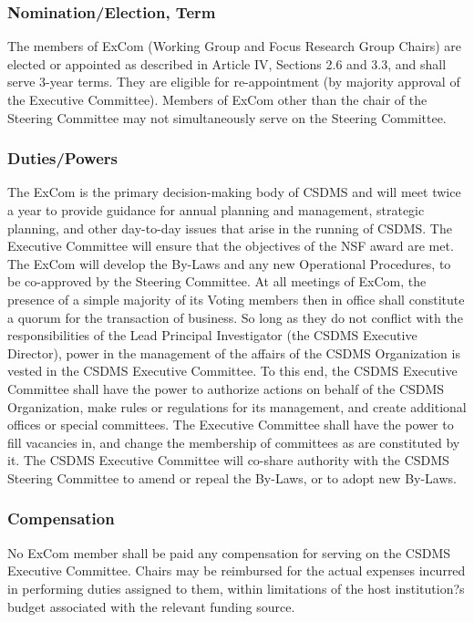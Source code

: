 \documentclass[11pt, oneside]{article}   	%
\begin{document}
\subsubsection{Nomination/Election, Term}

The members of ExCom (Working Group and Focus Research Group Chairs) are elected or appointed as described in Article IV, Sections 2.6 and 3.3, and shall serve 3-year terms.  They are eligible for re-appointment (by majority approval of the Executive Committee). Members of ExCom other than the chair of the Steering Committee may not simultaneously serve on the Steering Committee.  

\subsubsection{Duties/Powers}
	
The ExCom is the primary decision-making body of CSDMS and will meet twice a year to provide guidance for annual planning and management, strategic planning, and other day-to-day issues that arise in the running of CSDMS. The Executive Committee will ensure that the objectives of the NSF award are met. The ExCom will develop the By-Laws and any new Operational Procedures, to be co-approved by the Steering Committee. At all meetings of ExCom, the presence of a simple majority of its Voting members then in office shall constitute a quorum for the transaction of business. So long as they do not conflict with the responsibilities of the Lead Principal Investigator (the CSDMS Executive Director), power in the management of the affairs of the CSDMS Organization is vested in the CSDMS Executive Committee. To this end, the CSDMS Executive Committee shall have the power to authorize actions on behalf of the CSDMS Organization, make rules or regulations for its management, and create additional offices or special committees. The Executive Committee shall have the power to fill vacancies in, and change the membership of committees as are constituted by it.  The CSDMS Executive Committee will co-share authority with the CSDMS Steering Committee to amend or repeal the By-Laws, or to adopt new By-Laws.

\subsubsection{Compensation}
	
No ExCom member shall be paid any compensation for serving on the CSDMS Executive Committee. Chairs may be reimbursed for the actual expenses incurred in performing duties assigned to them, within limitations of the host institution?s budget associated with the relevant funding source.
\end{document}
